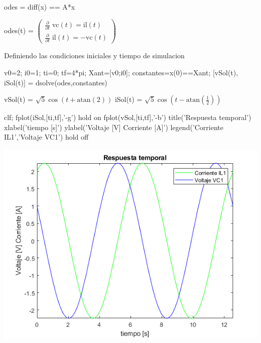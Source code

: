 \documentclass[10pt,a4paper]{article} %
\begin{document}
	\begin{matlabcode}
		odes = diff(x) == A*x
	\end{matlabcode}
	\begin{matlabsymbolicoutput}
		odes(t) = 
		$\displaystyle \left(\begin{array}{c}
		\frac{\partial }{\partial t}\;\textrm{vc}\left(t\right)=\textrm{il}\left(t\right)\\
		\frac{\partial }{\partial t}\;\textrm{il}\left(t\right)=-\textrm{vc}\left(t\right)
		\end{array}\right)$
	\end{matlabsymbolicoutput}
	
	\begin{par}
		\begin{flushleft}
			Definiendo las condiciones iniciales y tiempo de simulacion
		\end{flushleft}
	\end{par}
	
	\begin{matlabcode}
		v0=2;
		i0=1;
		ti=0;
		tf=4*pi;
		Xant=[v0;i0];
		constantes=x(0)==Xant;
		[vSol(t), iSol(t)] = dsolve(odes,constantes)
	\end{matlabcode}
	\begin{matlabsymbolicoutput}
		vSol(t) = 
		$\displaystyle \sqrt{5} \cos \left(t+\textrm{atan}\left(2\right)\right)$
		iSol(t) = 
		$\displaystyle \sqrt{5} \cos \left(t-\textrm{atan}\left(\frac{1}{2}\right)\right)$
	\end{matlabsymbolicoutput}
	
	
	\begin{matlabcode}
		clf;
		fplot(iSol,[ti,tf],'-g')
		hold on
		fplot(vSol,[ti,tf],'-b')
		title('Respuesta temporal')
		xlabel('tiempo [s]')
		ylabel('Voltaje [V] Corriente [A]')
		legend({'Corriente IL1','Voltaje VC1'})
		hold off
	\end{matlabcode}
	\begin{center}
		\includegraphics[width=\maxwidth{56.196688409433015em}]{figure_0_00}
	\end{center}
	
\end{document}
